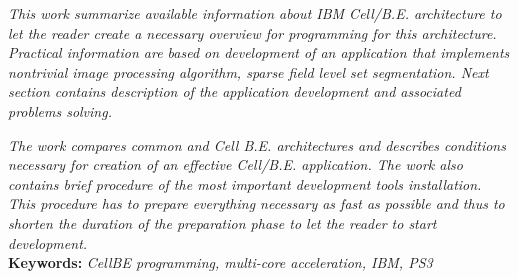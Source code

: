 \par
\noindent
\textit{
This work summarize available information about IBM \mbox{Cell/B.E.} architecture to let the reader create a necessary overview for programming for this architecture.
Practical information are based on development of an application that implements nontrivial image processing algorithm, sparse field level set segmentation.
Next section contains description of the application development and associated problems solving.
}\\
\par
\noindent
\textit{
The work compares common and Cell B.E. architectures and describes conditions necessary for creation of an effective \mbox{Cell/B.E.} application.
The work also contains brief procedure of the most important development tools installation.
This procedure has to prepare everything necessary as fast as possible and thus to shorten the duration of the preparation phase to let the reader to start development.
}\\

\noindent
\textbf{Keywords:} \textit{CellBE programming, multi-core acceleration, IBM, PS3}

\pagebreak